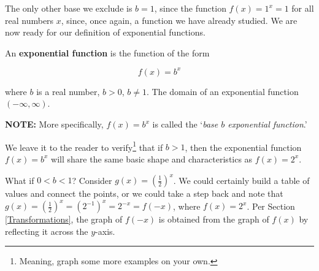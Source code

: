 \documentclass{ximera}
\begin{document}
The only other base we exclude is $b=1$, since the function $f(x) = 1^{x} = 1$ for all real numbers $x$, since, once again, a function we have already studied.  We are now ready for our definition of exponential functions.

\smallskip



\begin{definition} \label{expfcndefn}    An \textbf{exponential function} is the function of the form


\[ f(x) = b^{x}\]

 where $b$ is a  real number, $b > 0$, $b \neq 1$.   The domain of an exponential function  $(-\infty, \infty)$.
 
 \textbf{NOTE:}  More specifically, $f(x) = b^{x}$ is called the `\textit{base $b$ exponential function}.'
\end{definition}



\smallskip

We leave it to the reader to verify\footnote{Meaning, graph some more examples on your own.} that if $b > 1$, then the exponential function $f(x) = b^{x}$ will share the same basic shape and characteristics as $f(x) = 2^{x}$.  

\smallskip

What if $0 < b < 1$?  Consider $g(x) = \left(\frac{1}{2}\right)^{x}$.  We could certainly build a table of values and connect the points, or we could take a step back and note that $g(x) = \left(\frac{1}{2}\right)^{x} = \left(2^{-1}\right)^{x} = 2^{-x} = f(-x)$, where $f(x) = 2^{x}$.  Per Section \ref{Transformations}, the graph of $f(-x)$ is obtained from the graph of $f(x)$ by reflecting it across the $y$-axis. 
\end{document}
